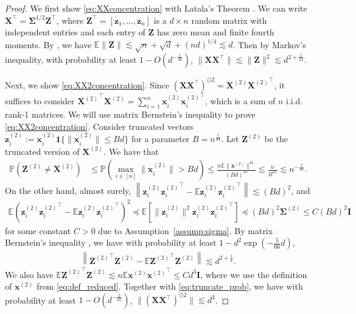 \documentclass[twoside,11pt]{article}
\renewcommand{\P}{\mathbb{P}}
\newcommand{\E}{\mathbb{E}}
\def\bI{{\mathbf I}}
\def\bX{{\boldsymbol X}}
\def\bZ{{\boldsymbol Z}}
\def\bx{{\boldsymbol x}}
\def\bz{{\boldsymbol z}}
\def\bSigma{{\boldsymbol \Sigma}}
\renewcommand{\P}{\mathbb{P}}
\newcommand{\1}{\mathbf{1}}
\def\tran{^\top}
\begin{document}
\begin{proof}
We first show \eqref{eq:XXconcentration} with Latala's Theorem \citep{latala2005some}. We can write $\bX^\top=\bSigma^{1/2} \bZ^\top$, where $\bZ^\top=[\bz_1,\dots,\bz_n]$ is a $d\times n$ random matrix with independent entries and each entry of $\bZ$ has zero mean and finite fourth moments. By \cite[Theorem 2]{latala2005some}, we have 
 $\E\|\bZ\|\lesssim \sqrt{n}+\sqrt{d}+(nd)^{1/4} \lesssim d$.
Then by Markov's inequality, with probability at least $1-O(d^{-\frac{1}{48}})$, 
$ \| \bX\bX^\top\| \lesssim \|\bZ\|^2\lesssim d^{2+\frac{1}{24}}$. 

Next, we show \eqref{eq:XX2concentration}. Since $(\bX\bX\tran)^{\odot 2}={\bX^{(2)}} {\bX^{(2)}}^\top$, it suffices to consider ${\bX^{(2)}}^\top \bX^{(2)}=\sum_{i=1}^n \bx_i^{(2)}{\bx_i^{(2)}}^\top$, which is a sum of $n$ i.i.d. rank-1 matrices. We will use matrix Bernstein's inequality \citep[Theorem 5.4.1]{vershynin2018high} to prove \eqref{eq:XX2concentration}. Consider truncated vectors ${\bz_i^{(2)}}:= \bx_i^{(2)}\1\{ \|\bx_i^{(2)}\|\leq B d\}$ for a parameter $B=n^{\frac{1}{44}}$. Let $\bZ^{(2)}$ be the truncated version of $\bX^{(2)}$. We have that
    \begin{align}
        \P \left( \bZ^{(2)}\not=\bX^{(2)}\right)&\leq \P \left(  \max_{i\in [n]}   \|\bx_i^{(2)}\|> B d \right)\leq \frac{n\E\|\bx^{(2)}\|^{45}}{(Bd)^{45}}\lesssim \frac{n}{B^{45}}\lesssim n^{-\frac{1}{45}}. \label{eq:truncate_prob}
    \end{align}
On the other hand, almost surely,
$\left\|{\bz_i^{(2)}}{\bz_i^{(2)}}^\top-\E{\bz_i^{(2)}}{\bz_i^{(2)}}^\top\right\|\lesssim (Bd)^2$,
and 
\begin{align}
    \E \left({\bz_i^{(2)}}{\bz_i^{(2)}}^\top-\E{\bz_i^{(2)}}{\bz_i^{(2)}}^\top \right)^2 \preccurlyeq \E\left[\|\bz_i^{(2)}\|^2 {\bz_i^{(2)}}{\bz_i^{(2)}}^\top\right]\preccurlyeq(Bd)^2\bSigma^{(2)}\leq C(Bd)^2\bI
\end{align}
for some  constant $C>0$ due to Assumption~\ref{assump:sigma}. By matrix Bernstein's inequality \citep[Theorem 5.4.1]{vershynin2018high}, we have with probability at least $1-d^2 \exp(-\frac{5}{66}d)$, 
    \begin{align}
        \left\| {\bZ^{(2)}}^\top \bZ^{(2)}-\E{\bZ^{(2)}}^\top \bZ^{(2)}\right\| \lesssim d^{2+\frac{1}{6}}.
    \end{align}
We also have
    $\E{\bZ^{(2)}}^\top \bZ^{(2)}\lesssim n \E \bx^{(2)}{\bx^{(2)}}^\top\leq Cd^3\bI$,
    where we use the definition of $\bx^{(2)}$ from \eqref{eq:def_reduced}.
    Together with \eqref{eq:truncate_prob}, we have with probability at least $1-O(d^{-\frac{2}{45}})$,
     $\|(\bX\bX\tran)^{\odot 2}\| \lesssim  d^{3}$.
     

\end{proof}
\end{document}
